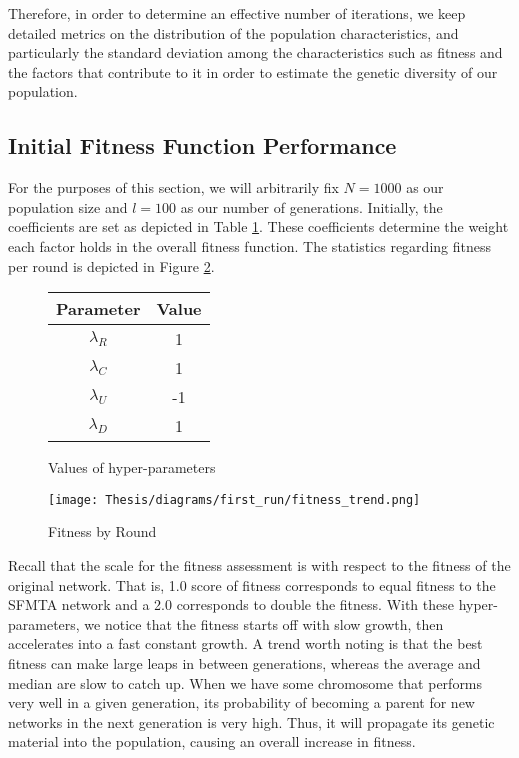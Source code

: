 \documentclass[11pt]{amsart}
\theoremstyle{definition}                  %
\theoremstyle{remark}                       %
\numberwithin{equation}{section}
\begin{document}
Therefore, in order to determine an effective number of iterations, we keep detailed metrics on the distribution of the population characteristics, and particularly the standard deviation among the characteristics such as fitness and the factors that contribute to it in order to estimate the genetic diversity of our population. 

\subsection{Initial Fitness Function Performance}
For the purposes of this section, we will arbitrarily fix $N=1000$ as our population size and $l = 100$ as our number of generations. Initially, the coefficients are set as depicted in Table \ref{table:coefficients_1}. These coefficients determine the weight each factor holds in the overall fitness function. The statistics regarding fitness per round is depicted in Figure \ref{fig:first_run_fitness}.

\begin{figure}[h]
    \centering
    \begin{tabular}{|c|c|}
        \hline
        Parameter & Value \\
         \hline
        $\lambda_{R}$ & 1\\
        $\lambda_{C}$ & 1\\
        $\lambda_{U}$ & -1\\
        $\lambda_{D}$ & 1\\
        \hline
    \end{tabular}
    \caption{Values of hyper-parameters}
    \label{table:coefficients_1}
\end{figure}

\begin{figure}[h]
    \centering
    \texttt{[image: Thesis/diagrams/first\_run/fitness\_trend.png]}
    \caption{Fitness by Round}
    \label{fig:first_run_fitness}
\end{figure}

Recall that the scale for the fitness assessment is with respect to the fitness of the original network. That is, 1.0 score of fitness corresponds to equal fitness to the SFMTA network and a 2.0 corresponds to double the fitness. With these hyper-parameters, we notice that the fitness starts off with slow growth, then accelerates into a fast constant growth. A trend worth noting is that the best fitness can make large leaps in between generations, whereas the average and median are slow to catch up. When we have some chromosome that performs very well in a given generation, its probability of becoming a parent for new networks in the next generation is very high. Thus, it will propagate its genetic material into the population, causing an overall increase in fitness. 
\end{document}
